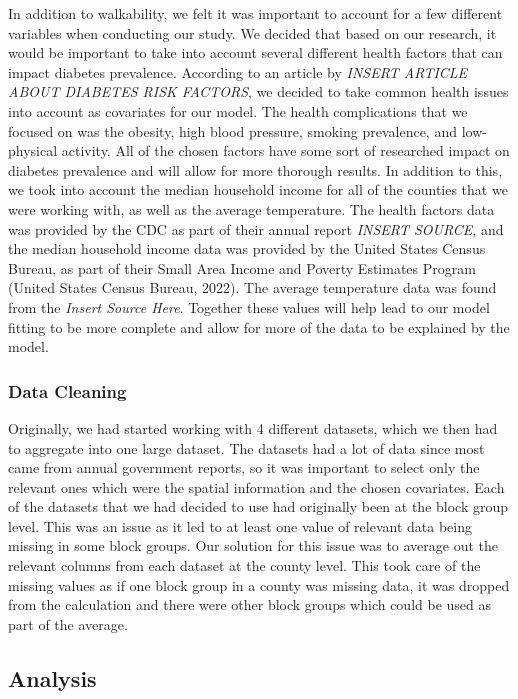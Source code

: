 \documentclass[
]{article}
\begin{document}
In addition to walkability, we felt it was important to account for a
few different variables when conducting our study. We decided that based
on our research, it would be important to take into account several
different health factors that can impact diabetes prevalence. According
to an article by \emph{INSERT ARTICLE ABOUT DIABETES RISK FACTORS}, we
decided to take common health issues into account as covariates for our
model. The health complications that we focused on was the obesity, high
blood pressure, smoking prevalence, and low-physical activity. All of
the chosen factors have some sort of researched impact on diabetes
prevalence and will allow for more thorough results. In addition to
this, we took into account the median household income for all of the
counties that we were working with, as well as the average temperature.
The health factors data was provided by the CDC as part of their annual
report \emph{INSERT SOURCE}, and the median household income data was
provided by the United States Census Bureau, as part of their Small Area
Income and Poverty Estimates Program (United States Census Bureau,
2022). The average temperature data was found from the \emph{Insert
Source Here}. Together these values will help lead to our model fitting
to be more complete and allow for more of the data to be explained by
the model.

\subsubsection{Data Cleaning}\label{data-cleaning}

Originally, we had started working with 4 different datasets, which we
then had to aggregate into one large dataset. The datasets had a lot of
data since most came from annual government reports, so it was important
to select only the relevant ones which were the spatial information and
the chosen covariates. Each of the datasets that we had decided to use
had originally been at the block group level. This was an issue as it
led to at least one value of relevant data being missing in some block
groups. Our solution for this issue was to average out the relevant
columns from each dataset at the county level. This took care of the
missing values as if one block group in a county was missing data, it
was dropped from the calculation and there were other block groups which
could be used as part of the average.

\subsection{Analysis}\label{analysis}
\end{document}
